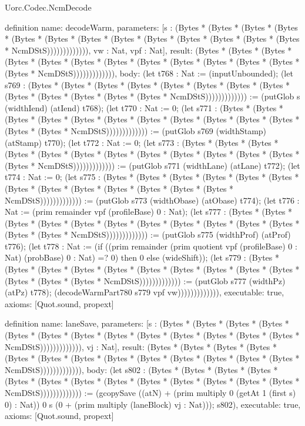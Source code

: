 \begin{lexlean}{Uorc.Codec.NcmDecode}
\begin{semanticmodule}
definition{
  name: decodeWarm,
  parameters: [s : (Bytes * (Bytes * (Bytes * (Bytes * (Bytes * (Bytes * (Bytes * (Bytes * (Bytes * (Bytes * (Bytes * (Bytes * (Bytes * NcmDStS))))))))))))), vw : Nat, vpf : Nat],
  result: (Bytes * (Bytes * (Bytes * (Bytes * (Bytes * (Bytes * (Bytes * (Bytes * (Bytes * (Bytes * (Bytes * (Bytes * (Bytes * NcmDStS))))))))))))),
  body: (let t768 : Nat := (inputUnbounded); (let s769 : (Bytes * (Bytes * (Bytes * (Bytes * (Bytes * (Bytes * (Bytes * (Bytes * (Bytes * (Bytes * (Bytes * (Bytes * (Bytes * NcmDStS))))))))))))) := (putGlob s (widthIend) (atIend) t768); (let t770 : Nat := 0; (let s771 : (Bytes * (Bytes * (Bytes * (Bytes * (Bytes * (Bytes * (Bytes * (Bytes * (Bytes * (Bytes * (Bytes * (Bytes * (Bytes * NcmDStS))))))))))))) := (putGlob s769 (widthStamp) (atStamp) t770); (let t772 : Nat := 0; (let s773 : (Bytes * (Bytes * (Bytes * (Bytes * (Bytes * (Bytes * (Bytes * (Bytes * (Bytes * (Bytes * (Bytes * (Bytes * (Bytes * NcmDStS))))))))))))) := (putGlob s771 (widthLane) (atLane) t772); (let t774 : Nat := 0; (let s775 : (Bytes * (Bytes * (Bytes * (Bytes * (Bytes * (Bytes * (Bytes * (Bytes * (Bytes * (Bytes * (Bytes * (Bytes * (Bytes * NcmDStS))))))))))))) := (putGlob s773 (widthObase) (atObase) t774); (let t776 : Nat := (prim remainder vpf (profileBase) 0 : Nat); (let s777 : (Bytes * (Bytes * (Bytes * (Bytes * (Bytes * (Bytes * (Bytes * (Bytes * (Bytes * (Bytes * (Bytes * (Bytes * (Bytes * NcmDStS))))))))))))) := (putGlob s775 (widthProf) (atProf) t776); (let t778 : Nat := (if ((prim remainder (prim quotient vpf (profileBase) 0 : Nat) (probBase) 0 : Nat) =? 0) then 0 else (wideShift)); (let s779 : (Bytes * (Bytes * (Bytes * (Bytes * (Bytes * (Bytes * (Bytes * (Bytes * (Bytes * (Bytes * (Bytes * (Bytes * (Bytes * NcmDStS))))))))))))) := (putGlob s777 (widthPz) (atPz) t778); (decodeWarmPart780 s779 vpf vw))))))))))))),
  executable: true,
  axioms: [Quot.sound, propext]
}

definition{
  name: laneSave,
  parameters: [s : (Bytes * (Bytes * (Bytes * (Bytes * (Bytes * (Bytes * (Bytes * (Bytes * (Bytes * (Bytes * (Bytes * (Bytes * (Bytes * NcmDStS))))))))))))), vj : Nat],
  result: (Bytes * (Bytes * (Bytes * (Bytes * (Bytes * (Bytes * (Bytes * (Bytes * (Bytes * (Bytes * (Bytes * (Bytes * (Bytes * NcmDStS))))))))))))),
  body: (let s802 : (Bytes * (Bytes * (Bytes * (Bytes * (Bytes * (Bytes * (Bytes * (Bytes * (Bytes * (Bytes * (Bytes * (Bytes * (Bytes * NcmDStS))))))))))))) := (gcopySave ((atN) + (prim multiply 0 (getAt 1 (first s) 0) : Nat)) 0 s (0 + (prim multiply (laneBlock) vj : Nat))); s802),
  executable: true,
  axioms: [Quot.sound, propext]
}


\end{semanticmodule}
\end{lexlean}
